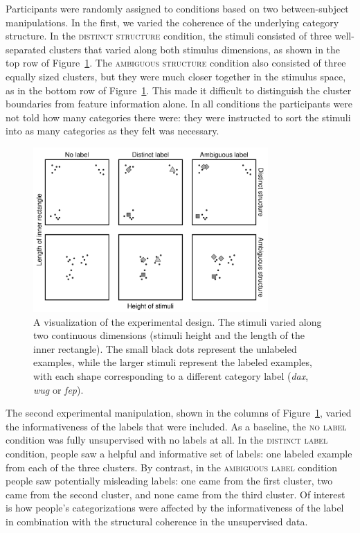 \documentclass[a4paper, doc]{apa6}
\begin{document}
Participants were randomly assigned to conditions based on two between-subject manipulations. In the first, we varied the coherence of the underlying category structure. In the \textsc{distinct structure} condition, the stimuli consisted of three well-separated clusters that varied along both stimulus dimensions, as shown in the top row of Figure~\ref{experiment-conditions}. The \textsc{ambiguous structure} condition also consisted of three equally sized clusters, but they were much closer together in the stimulus space, as in the bottom row of Figure~\ref{experiment-conditions}. This made it difficult to distinguish the cluster boundaries from feature information alone. In all conditions the participants were not told how many categories there were: they were instructed to sort the stimuli into as many categories as they felt was necessary.

\begin{figure}[t]
  \begin{center}
    \includegraphics[width=0.8\textwidth]{figures/category-structures.pdf}
    \caption{A visualization of the experimental design. The stimuli varied along two continuous dimensions (stimuli height and the length of the inner rectangle). The small black dots represent the unlabeled examples, while the larger stimuli represent the labeled examples, with each shape corresponding to a different category label ({\it dax}, {\it wug} or {\it fep}).}
    \label{experiment-conditions}
  \end{center}
\end{figure}

The second experimental manipulation, shown in the columns of Figure~\ref{experiment-conditions}, varied the informativeness of the labels that were included. As a baseline, the \textsc{no label} condition was fully unsupervised with no labels at all. In the \textsc{distinct label} condition, people saw a helpful and informative set of labels: one labeled example from each of the three clusters. By contrast, in the \textsc{ambiguous label} condition people saw potentially misleading labels: one came from the first cluster, two came from the second cluster, and none came from the third cluster. Of interest is how people's categorizations were affected by the informativeness of the label in combination with the structural coherence in the unsupervised data.
\end{document}

